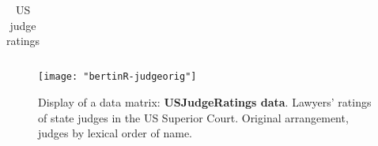 \documentclass[nogin, dvips,12pt,a4paper,twoside]{amsart}
\begin{document}
\begin{table}[ht]
\begin{center}
{\begin{tabular}{rrrrrrrrrrrrr}
\hline
\end{tabular}
}
\caption{US judge ratings}
\label{tab:judge}
\end{center}
\end{table}




\begin{figure}[htbp]
\begin{center}
\texttt{[image: "bertinR-judgeorig"]}
\caption{Display of a data matrix: \textbf{USJudgeRatings data}. Lawyers' ratings of state judges in the US Superior Court. Original arrangement, judges by lexical order of name.}
\label{fig:judgeorig}
\end{center}
\end{figure}
\end{document}
